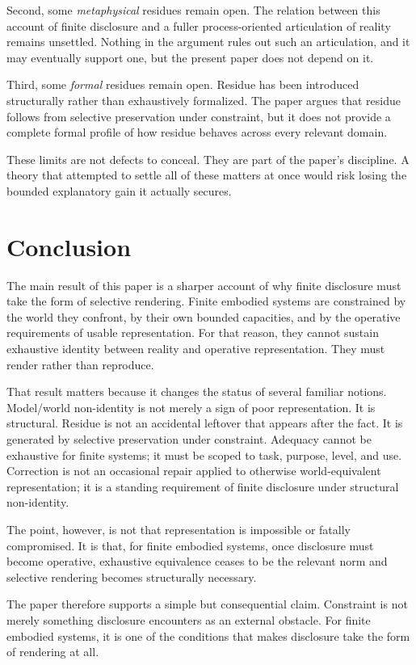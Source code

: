 \documentclass[11pt]{article}
\renewcommand{\emph}[1]{\textit{#1}}
\begin{document}
Second, some \emph{metaphysical} residues remain open. The relation between this account of finite disclosure and a fuller process-oriented articulation of reality remains unsettled. Nothing in the argument rules out such an articulation, and it may eventually support one, but the present paper does not depend on it.

Third, some \emph{formal} residues remain open. Residue has been introduced structurally rather than exhaustively formalized. The paper argues that residue follows from selective preservation under constraint, but it does not provide a complete formal profile of how residue behaves across every relevant domain.

These limits are not defects to conceal. They are part of the paper's discipline. A theory that attempted to settle all of these matters at once would risk losing the bounded explanatory gain it actually secures.

\section{Conclusion}

The main result of this paper is a sharper account of why finite disclosure must take the form of selective rendering. Finite embodied systems are constrained by the world they confront, by their own bounded capacities, and by the operative requirements of usable representation. For that reason, they cannot sustain exhaustive identity between reality and operative representation. They must render rather than reproduce.

That result matters because it changes the status of several familiar notions. Model/world non-identity is not merely a sign of poor representation. It is structural. Residue is not an accidental leftover that appears after the fact. It is generated by selective preservation under constraint. Adequacy cannot be exhaustive for finite systems; it must be scoped to task, purpose, level, and use. Correction is not an occasional repair applied to otherwise world-equivalent representation; it is a standing requirement of finite disclosure under structural non-identity.

The point, however, is not that representation is impossible or fatally compromised. It is that, for finite embodied systems, once disclosure must become operative, exhaustive equivalence ceases to be the relevant norm and selective rendering becomes structurally necessary.

The paper therefore supports a simple but consequential claim. Constraint is not merely something disclosure encounters as an external obstacle. For finite embodied systems, it is one of the conditions that makes disclosure take the form of rendering at all.
\end{document}
